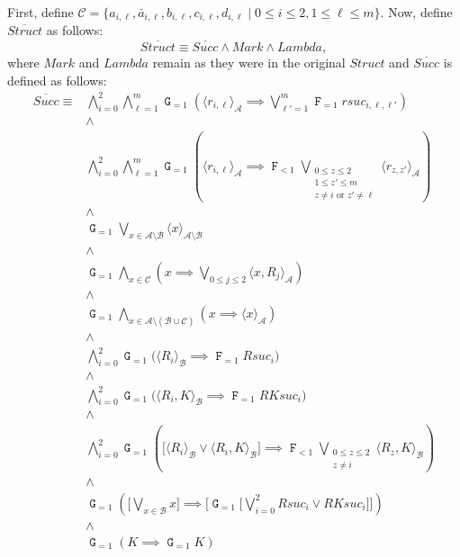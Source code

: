 \documentclass[a4paper,UKenglish,cleveref, autoref, thm-restate]{lipics-v2021}
\newcommand{\A}{\mathcal{A}}
\newcommand{\B}{\mathcal{B}}
\newcommand{\ex}[1]{\langle #1 \rangle}
\newcommand{\Succ}{\mathit{Succ}}
\newcommand{\Struct}{\textit{Struct}}
\newcommand*{\opf}{\operatorname{\pmb{\mathtt{F}}}}
\newcommand*{\opg}{\operatorname{\pmb{\mathtt{G}}}}
\begin{document}
First, define $\mathcal{C} = \{a_{i,\ell},\bar{a}_{i,\ell},b_{i,\ell},c_{i,\ell},d_{i,\ell} \mid 0\leq i \leq 2, 1\leq \ell \leq m\}$.
Now, define $\overline{\Struct}$ as follows:
\[ \overline{\Struct} \equiv \overline{\Succ} \wedge Mark \wedge Lambda, \]
where $Mark$ and $Lambda$ remain as they were in the original $\Struct$
and $\overline{\Succ}$ is defined as follows:
\begin{align*}
  \overline{\Succ} \equiv &
  \bigwedge_{i=0}^{2}
  \bigwedge_{\ell=1}^{m}
  \opg_{=1}
  \left(
    \langle r_{i,\ell} \rangle_{\A}
    \implies
    \bigvee_{\ell'=1}^{m} \opf_{=1} rsuc_{i,\ell,\ell'}
  \right) \\
  & \wedge \\
  & \bigwedge_{i=0}^{2}
    \bigwedge_{\ell=1}^{m}
    \opg_{=1}
    \left(
      \langle r_{i,\ell} \rangle_{\A}
      \implies
      \opf_{<1}
      \bigvee_{\substack{
                 0 \leq z \leq 2 \\
                 1 \leq z' \leq m \\
                 z \neq i \text{ or } z' \neq \ell}
                }
      \ex{r_{z,z'}}_{\A} 
    \right) \\
  & \wedge \\
  & \opg_{=1} \bigvee_{x \in \A \setminus \B} \ex{x}_{\A \setminus \B} \\
  & \wedge \\
  & \opg_{=1} \bigwedge_{x \in \mathcal{C}} \left( x \implies \bigvee_{0 \leq j \leq 2} \ex{x,R_j}_{\A} \right) \\
  & \wedge \\
  & \opg_{=1} \bigwedge_{x \in \A \setminus (\B \cup \mathcal{C})} \left( x \implies \ex{x}_{\A} \right) \\
  & \wedge \\
  & \bigwedge_{i=0}^{2}
    \opg_{=1}
    \bigg( \ex{R_i}_{\B} \implies \opf_{=1} Rsuc_i \bigg) \\
  & \wedge \\
  & \bigwedge_{i=0}^{2}
    \opg_{=1}
    \bigg( \ex{R_i,K}_{\B} \implies \opf_{=1} RKsuc_i \bigg) \\
  & \wedge \\
  & \bigwedge_{i=0}^2
    \opg_{=1}
    \left(
      \bigg[ \ex{R_i}_{\B} \vee \ex{R_i,K}_{\B} \bigg]
    \implies
    \opf_{<1} \bigvee_{\substack{0 \leq z \leq 2 \\ z \neq i}} \ex{R_{z},K}_\B
    \right) \\
  & \wedge \\
  & \opg_{=1}
    \left(
      \bigg[
        \bigvee_{x \in \B} x
      \bigg]
      \implies
      \bigg[
        \opg_{=1} \big[ \bigvee_{i=0}^2 Rsuc_i \vee RKsuc_i \big]
      \bigg]
    \right) \\
  & \wedge \\
  & \opg_{=1} (K \implies \opg_{=1} K)
\end{align*}
\end{document}
